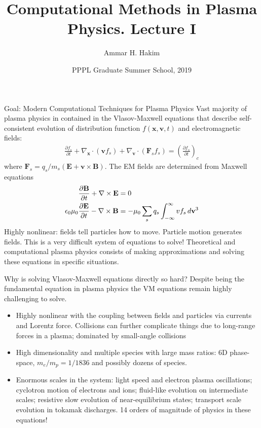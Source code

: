 \documentclass[pdf]{beamer}
\title[{\tt }] {Computational Methods in Plasma Physics. Lecture I}%
\author[http://cmpp.rtfd.io]%
{Ammar H. Hakim\inst{1}}%
\institute[PPPL]
{ \inst{1} Princeton Plasma Physics Laboratory, Princeton, NJ %
}
\date[11/8/2019]{PPPL Graduate Summer School, 2019}
\newcommand{\pfrac}[2]{\frac{\partial #1}{\partial #2}}
\newcommand{\mvec}[1]{\mathbf{#1}}
\newcommand{\gcs}{\nabla_{\mvec{x}}}
\newcommand{\gvs}{\nabla_{\mvec{v}}}
\theoremstyle{definition}
\begin{document}
\begin{frame}
  \titlepage
\end{frame}

\begin{frame}{Goal: Modern Computational Techniques for Plasma Physics}
  \footnotesize Vast majority of plasma physics in contained in the
  Vlasov-Maxwell equations that describe self-consistent evolution of
  distribution function $f(\mvec{x},\mvec{v},t)$ and electromagnetic
  fields:
  \begin{align*}
    \pfrac{f_s}{t} + \gcs\cdot (\mvec{v} f_s) + \gvs\cdot (\mvec{F}_s
    f_s) = \left( \pfrac{f_s}{t} \right)_c
  \end{align*}
  where $\mvec{F}_s=q_s/m_s (\mvec{E}+\mvec{v}\times\mvec{B})$. The EM
  fields are determined from Maxwell equations
  \begin{align*}
    \frac{\partial \mvec{B}}{\partial t} + \nabla\times\mvec{E} &= 0 \\
    \epsilon_0\mu_0\frac{\partial \mvec{E}}{\partial t} -
    \nabla\times\mvec{B} &= -\mu_0\sum_s q_s \int_{-\infty}^\infty v f_s \thinspace d\mvec{v}^3
  \end{align*}
  Highly nonlinear: fields tell particles how to move. Particle motion
  generates fields. This is a very difficult system of equations to
  solve! Theoretical and computational plasma physics consists of
  making approximations and solving these equations in specific
  situations.
\end{frame}

\begin{frame}{Why is solving Vlasov-Maxwell equations directly so
    hard?}
  Despite being the fundamental equation in plasma physics the VM
  equations remain highly challenging to solve.
  \begin{itemize}
  \item Highly nonlinear with the coupling between fields and
    particles via currents and Lorentz force. Collisions can further
    complicate things due to long-range forces in a plasma; dominated
    by small-angle collisions
  \item High dimensionality and multiple species with large mass
    ratios: 6D phase-space, $m_e/m_p = 1/1836$ and possibly dozens of
    species.
  \item Enormous scales in the system: light speed and electron plasma
    oscillations; cyclotron motion of electrons and ions; fluid-like
    evolution on intermediate scales; resistive slow evolution of
    near-equilibrium states; transport scale evolution in tokamak
    discharges.  14 orders of magnitude of physics in these
    equations!
  \end{itemize}
\end{frame}
\end{document}

